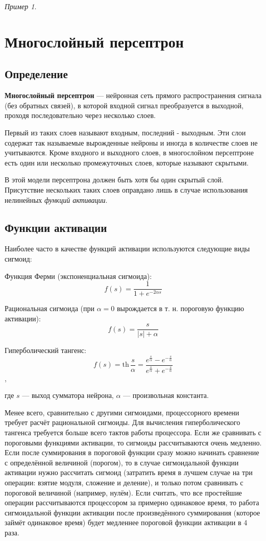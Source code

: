 \documentclass[a4paper, 12pt]{article}
\theoremstyle{plain} %
\theoremstyle{definition} %
\theoremstyle{remark} %
\newtheorem{example}{Пример}
\begin{document}
\begin{example}
\section{Многослойный персептрон}

\subsection{Определение}

\textbf{Многослойный персептрон} --- нейронная сеть прямого распространения сигнала (без обратных связей), в которой входной сигнал преобразуется в выходной, проходя последовательно через несколько слоев.

Первый из таких слоев называют входным, последний - выходным. Эти слои содержат так называемые вырожденные нейроны и иногда в количестве слоев не учитываются. Кроме входного и выходного слоев, в многослойном персептроне есть один или несколько промежуточных слоев, которые называют скрытыми.

В этой модели персептрона должен быть хотя бы один скрытый слой. Присутствие нескольких таких слоев оправдано лишь в случае использования нелинейных \emph{функций активации}.

\subsection{Функции активации}

Наиболее часто в качестве функций активации используются следующие виды сигмоид:

Функция Ферми (экспоненциальная сигмоида):
\[
	f(s)= \frac{1}{1+e^{-2 \alpha s}}
\]

Рациональная сигмоида (при $\alpha=0$ вырождается в т. н. пороговую функцию активации):
\[
f(s)= \frac{s}{|s|+ \alpha}
\]

Гиперболический тангенс:
\[
	f(s)= \mathrm{th}\, \frac{s}{\alpha} = \frac{ e^{ \frac{s}{\alpha} } - e^{ - \frac{s}{\alpha}} }
	{e^{ \frac{s}{\alpha} } + e^{ - \frac{s}{\alpha}}}
\]
,

где $s$ — выход сумматора нейрона, $\alpha$ — произвольная константа.

Менее всего, сравнительно с другими сигмоидами, процессорного времени требует расчёт рациональной сигмоиды. Для вычисления гиперболического тангенса требуется больше всего тактов работы процессора. Если же сравнивать с пороговыми функциями активации, то сигмоиды рассчитываются очень медленно. Если после суммирования в пороговой функции сразу можно начинать сравнение с определённой величиной (порогом), то в случае сигмоидальной функции активации нужно рассчитать сигмоид (затратить время в лучшем случае на три операции: взятие модуля, сложение и деление), и только потом сравнивать с пороговой величиной (например, нулём). Если считать, что все простейшие операции рассчитываются процессором за примерно одинаковое время, то работа сигмоидальной функции активации после произведённого суммирования (которое займёт одинаковое время) будет медленнее пороговой функции активации в 4 раза.


\end{example}
\end{document}
